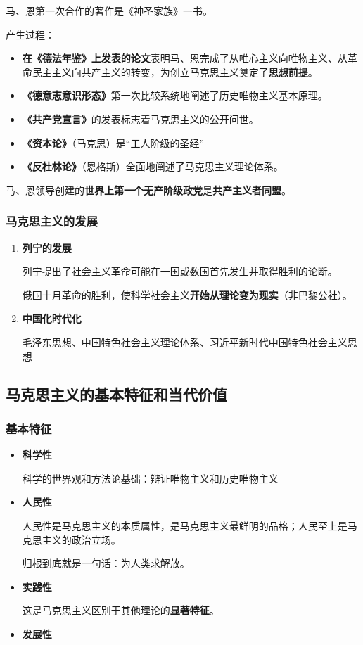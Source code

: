 \documentclass[12pt, a4paper, oneside]{ctexart}
\begin{document}
马、恩第一次合作的著作是《神圣家族》一书。

产生过程：
\begin{itemize}
  \item \textbf{在《德法年鉴》上发表的论文}表明马、恩完成了从唯心主义向唯物主义、从革命民主主义向共产主义的转变，为创立马克思主义奠定了\textbf{思想前提}。
  \item \textbf{《德意志意识形态》}第一次比较系统地阐述了历史唯物主义基本原理。
  \item \textbf{《共产党宣言》}的发表标志着马克思主义的公开问世。
  \item \textbf{《资本论》}（马克思）是“工人阶级的圣经”
  \item \textbf{《反杜林论》}（恩格斯）全面地阐述了马克思主义理论体系。
\end{itemize}

马、恩领导创建的\textbf{世界上第一个无产阶级政党}是\textbf{共产主义者同盟}。

\subsubsection{马克思主义的发展}

\begin{enumerate}
  \item {\bf 列宁的发展}
  
  列宁提出了社会主义革命可能在一国或数国首先发生并取得胜利的论断。

  俄国十月革命的胜利，使科学社会主义\textbf{开始从理论变为现实}（非巴黎公社）。

  \item {\bf 中国化时代化}
  
  毛泽东思想、中国特色社会主义理论体系、习近平新时代中国特色社会主义思想
\end{enumerate}

\subsection{马克思主义的基本特征和当代价值}

\subsubsection{基本特征}

\begin{itemize}
  \item {\bf 科学性}
  
  科学的世界观和方法论基础：辩证唯物主义和历史唯物主义

  \item {\bf 人民性}
  
  人民性是马克思主义的本质属性，是马克思主义最鲜明的品格；人民至上是马克思主义的政治立场。

  归根到底就是一句话：为人类求解放。
  
  \item {\bf 实践性}
  
  这是马克思主义区别于其他理论的\textbf{显著特征}。

  \item {\bf 发展性}
\end{itemize}
\end{document}

